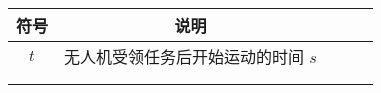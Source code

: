 \documentclass[../main.tex]{subfiles}
\begin{document}




\begin{table}[H]
\centering
\tabcolsep=2cm%
\begin{tabular}{ccccc}
\toprule[1.5pt]
符号 & 说明  \\ 
\midrule[1pt]
$t$       & 无人机受领任务后开始运动的时间         $s$               \\
&                 \\
&                 \\

\bottomrule[1.5pt]
\end{tabular}
\end{table}
\end{document}
